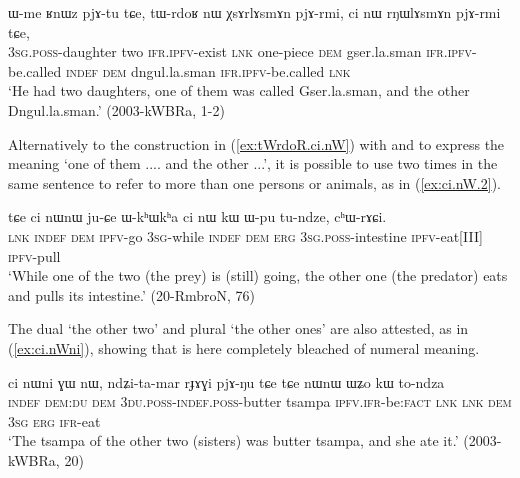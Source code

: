 \begin{exe}
\ex \label{ex:tWrdoR.ci.nW}
 \gll 
ɯ-me ʁnɯz pjɤ-tu tɕe, tɯ-rdoʁ nɯ χsɤrlɤsmɤn pjɤ-rmi, ci nɯ rŋɯlɤsmɤn pjɤ-rmi tɕe, \\
\textsc{3sg}.\textsc{poss}-daughter two \textsc{ifr}.\textsc{ipfv}-exist \textsc{lnk} one-piece \textsc{dem} gser.la.sman \textsc{ifr}.\textsc{ipfv}-be.called \textsc{indef} \textsc{dem} dngul.la.sman \textsc{ifr}.\textsc{ipfv}-be.called \textsc{lnk} \\
\glt `He had two daughters, one of them was called Gser.la.sman, and the other Dngul.la.sman.' (2003-kWBRa, 1-2)
\end{exe}

Alternatively to the construction in (\ref{ex:tWrdoR.ci.nW}) with  and  to express the meaning `one of them .... and the other ...', it is possible to use  two times in the same sentence to refer to more than one persons or animals, as in (\ref{ex:ci.nW.2}).

\begin{exe}
\ex \label{ex:ci.nW.2}
 \gll tɕe ci nɯnɯ ju-ɕe ɯ-kʰɯkʰa ci nɯ kɯ ɯ-pu tu-ndze, cʰɯ-rɤɕi. \\
\textsc{lnk} \textsc{indef} \textsc{dem} \textsc{ipfv}-go \textsc{3sg}-while \textsc{indef} \textsc{dem} \textsc{erg} \textsc{3sg}.\textsc{poss}-intestine \textsc{ipfv}-eat[III] \textsc{ipfv}-pull \\
\glt `While one of the two (the prey) is (still) going, the other one (the predator) eats and pulls its intestine.'  (20-RmbroN, 76)
\end{exe}

The dual  `the other two' and plural  `the other ones' are also attested, as in (\ref{ex:ci.nWni}), showing that  is here completely bleached of numeral meaning.

 \begin{exe}
\ex \label{ex:ci.nWni}
 \gll  ci nɯni ɣɯ nɯ, ndʑi-ta-mar rɟɤɣi pjɤ-ŋu tɕe tɕe nɯnɯ ɯʑo kɯ to-ndza \\
\textsc{indef} \textsc{dem}:\textsc{du} \gen \textsc{dem} \textsc{3du}.\textsc{poss}-\textsc{indef}.\textsc{poss}-butter tsampa \textsc{ipfv}.\textsc{ifr}-be:\textsc{fact} \textsc{lnk} \textsc{lnk} \textsc{dem} \textsc{3sg} \textsc{erg} \textsc{ifr}-eat \\
\glt `The tsampa of the other two (sisters) was butter tsampa, and she ate it.' (2003-kWBRa, 20)
\end{exe}

